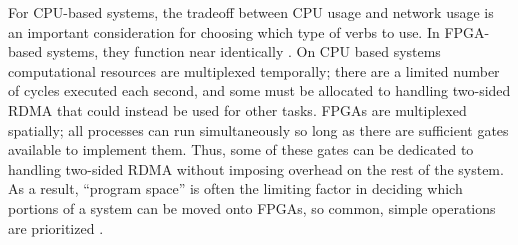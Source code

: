 For CPU-based systems, the tradeoff between CPU usage and network usage is an important consideration for choosing which type of verbs to use. In FPGA-based systems, they function near identically \autocite{strom}. On CPU based systems computational resources are multiplexed temporally; there are a limited number of cycles executed each second, and some must be allocated to handling two-sided RDMA that could instead be used for other tasks. FPGAs are multiplexed spatially; all processes can run simultaneously so long as there are sufficient gates available to implement them. Thus, some of these gates can be dedicated to handling two-sided RDMA without imposing overhead on the rest of the system. As a result, ``program space'' is often the limiting factor in deciding which portions of a system can be moved onto FPGAs, so common, simple operations are prioritized \autocite{honeycomb,moghaddamfar-damon-2021}.
